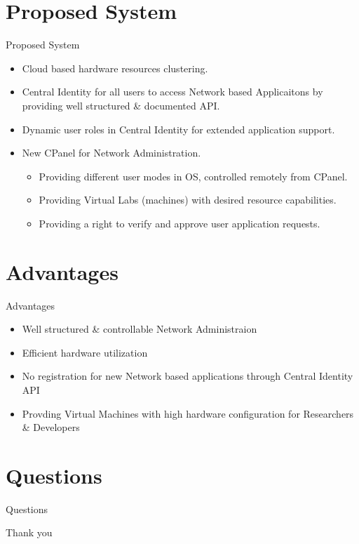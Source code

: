 \documentclass[xcolor=dvipsnames]{beamer}
\begin{document}
\section{Proposed System}
\begin{frame}{Proposed System}
\begin{itemize}
	\item Cloud based hardware resources clustering.
	\item Central Identity for all users to access Network based Applicaitons by providing well structured \& documented API.
	\item Dynamic user roles in Central Identity for extended application support.
	\item New CPanel for Network Administration.
		\begin{itemize}
			\item Providing different user modes in OS, controlled remotely from CPanel.
			\item Providing Virtual Labs (machines) with desired resource capabilities.
			\item Providing a right to verify and approve user application requests.
		\end{itemize}
\end{itemize}
\end{frame}

\section{Advantages}
\begin{frame}{Advantages}
\begin{itemize}
	\item Well structured \& controllable Network Administraion
	\item Efficient hardware utilization
	\item No registration for new Network based applications through Central Identity API
	\item Provding Virtual Machines with high hardware configuration for Researchers \& Developers
\end{itemize}

\end{frame}

\section{Questions}
\begin{frame}
\centering
Questions 
\end{frame}

\begin{frame}
Thank you 
\end{frame}
\end{document}
